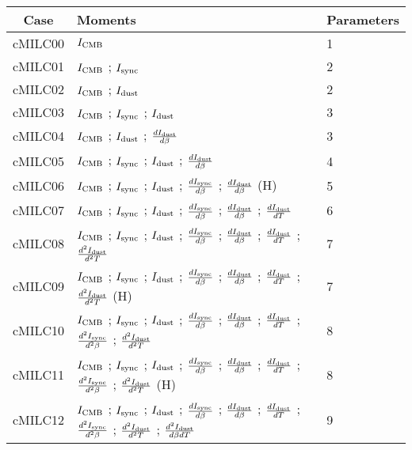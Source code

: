 \begin{tabular}{cll}
\toprule
    Case &                                                                                                                                                                                                                                                                                                         Moments &  Parameters \\
\midrule
 cMILC00 &  $I_{\rm CMB}$ &  1 \\
 cMILC01 &  $I_{\rm CMB}$ ; $I_{\rm sync}$ &  2 \\
 cMILC02 &  $I_{\rm CMB}$ ; $I_{\rm dust}$ &  2 \\
 cMILC03 &  $I_{\rm CMB}$ ; $I_{\rm sync}$ ; $I_{\rm dust}$ &  3 \\
 cMILC04 &  $I_{\rm CMB}$ ; $I_{\rm dust}$ ; $\frac{d I_{\rm dust}}{d \beta}$ &  3 \\
 cMILC05 &  $I_{\rm CMB}$ ; $I_{\rm sync}$ ; $I_{\rm dust}$ ; $\frac{d I_{\rm dust}}{d \beta}$ &  4 \\
 cMILC06 &  $I_{\rm CMB}$ ; $I_{\rm sync}$ ; $I_{\rm dust}$ ; $\frac{d I_{\rm sync}}{d \beta}$ ; $\frac{d I_{\rm dust}}{d \beta}$ (H) &  5 \\
 cMILC07 &  $I_{\rm CMB}$ ; $I_{\rm sync}$ ; $I_{\rm dust}$ ; $\frac{d I_{\rm sync}}{d \beta}$ ; $\frac{d I_{\rm dust}}{d \beta}$ ; $\frac{d I_{\rm dust}}{d T}$ &  6 \\
 cMILC08 &  $I_{\rm CMB}$ ; $I_{\rm sync}$ ; $I_{\rm dust}$ ; $\frac{d I_{\rm sync}}{d \beta}$ ; $\frac{d I_{\rm dust}}{d \beta}$ ; $\frac{d I_{\rm dust}}{d T}$ ; $\frac{d^2 I_{\rm dust}}{d^2 T}$ &  7 \\
 cMILC09 &  $I_{\rm CMB}$ ; $I_{\rm sync}$ ; $I_{\rm dust}$ ; $\frac{d I_{\rm sync}}{d \beta}$ ; $\frac{d I_{\rm dust}}{d \beta}$ ; $\frac{d I_{\rm dust}}{d T}$ ; $\frac{d^2 I_{\rm dust}}{d^2 T}$ (H) &  7 \\
 cMILC10 &  $I_{\rm CMB}$ ; $I_{\rm sync}$ ; $I_{\rm dust}$ ; $\frac{d I_{\rm sync}}{d \beta}$ ; $\frac{d I_{\rm dust}}{d \beta}$ ; $\frac{d I_{\rm dust}}{d T}$ ; $\frac{d^2 I_{\rm sync}}{d^2 \beta}$ ; $\frac{d^2 I_{\rm dust}}{d^2 T}$ &  8 \\
 cMILC11 &  $I_{\rm CMB}$ ; $I_{\rm sync}$ ; $I_{\rm dust}$ ; $\frac{d I_{\rm sync}}{d \beta}$ ; $\frac{d I_{\rm dust}}{d \beta}$ ; $\frac{d I_{\rm dust}}{d T}$ ; $\frac{d^2 I_{\rm sync}}{d^2 \beta}$ ; $\frac{d^2 I_{\rm dust}}{d^2 T}$ (H) &  8 \\
 cMILC12 &  $I_{\rm CMB}$ ; $I_{\rm sync}$ ; $I_{\rm dust}$ ; $\frac{d I_{\rm sync}}{d \beta}$ ; $\frac{d I_{\rm dust}}{d \beta}$ ; $\frac{d I_{\rm dust}}{d T}$ ; $\frac{d^2 I_{\rm sync}}{d^2 \beta}$ ; $\frac{d^2 I_{\rm dust}}{d^2 T}$ ; $\frac{d^2 I_{\rm dust}}{d \beta d T}$ &  9 \\

\end{tabular}

